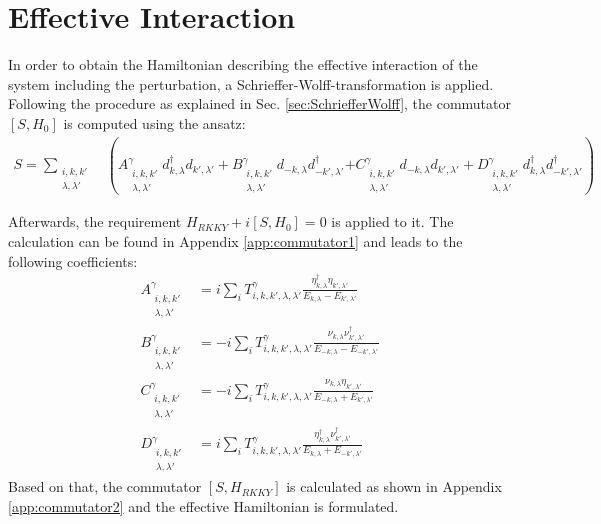 \section{Effective Interaction} \label{sec:eff_interaction}
In order to obtain the Hamiltonian describing the effective interaction of the system including the perturbation, a Schrieffer-Wolff-transformation is applied.
Following the procedure as explained in Sec. \ref{sec:SchriefferWolff}, the commutator $[S,H_0]$ is computed using the ansatz:
\begin{align} \label{eq:ansatzSWT}
    S = \sum_{\substack{i,k,k'\\ \lambda, \lambda'}} &\left(  A_{\substack{i,k,k'\\ \lambda, \lambda'}} ^{\gamma} d^{\dag}_{k,\lambda} d_{k', \lambda'}+ B_{\substack{i,k,k'\\ \lambda, \lambda'}} ^{\gamma} d_{-k,\lambda} d^{\dag}_{-k', \lambda'} \right.
    \left.+ C_{\substack{i,k,k'\\ \lambda, \lambda'}} ^{\gamma} d_{-k,\lambda} d_{k', \lambda'}+ D_{\substack{i,k,k'\\ \lambda, \lambda'}} ^{\gamma} d^{\dag}_{k,\lambda} d^{\dag}_{-k', \lambda'} \right)
\end{align}

Afterwards, the requirement $H_{RKKY} + i[S,H_0]=0$ is applied to it. 
The calculation can be found in Appendix \ref{app:commutator1} and leads to the following coefficients:
\begin{align}\nonumber
    A_{\substack{i, k,k'\\ \lambda, \lambda'}} ^{\gamma} &= i \sum_i T ^{\gamma}_{i,k,k', \lambda, \lambda'} \frac{\eta^{\dag}_{k,\lambda} \eta_{k',\lambda'}}{E_{k,\lambda} - E_{k', \lambda'}}\\ \nonumber
    B_{\substack{i, k,k'\\ \lambda, \lambda'}} ^{\gamma} &= -i \sum_i T ^{\gamma}_{i,k,k', \lambda, \lambda'} \frac{\nu_{k,\lambda} \nu^{\dag}_{k',\lambda'}}{E_{-k, \lambda}-E_{-k',\lambda'} }\\ \nonumber
    C_{\substack{i, k,k'\\ \lambda, \lambda'}} ^{\gamma} &= -i \sum_i T ^{\gamma}_{i,k,k', \lambda, \lambda'} \frac{\nu_{k,\lambda} \eta_{k',\lambda'}}{E_{-k,\lambda} + E_{k', \lambda'}}\\ \label{eq:SWT_result}
    D_{\substack{i, k,k'\\ \lambda, \lambda'}} ^{\gamma} &= i \sum_i T ^{\gamma}_{i,k,k', \lambda, \lambda'} \frac{\eta^{\dag}_{k,\lambda} \nu^{\dag}_{k',\lambda'}}{E_{k,\lambda} + E_{-k', \lambda'}}
\end{align}
Based on that, the commutator $[S, H_{RKKY}]$ is calculated as shown in Appendix \ref{app:commutator2} and the effective Hamiltonian is formulated.

